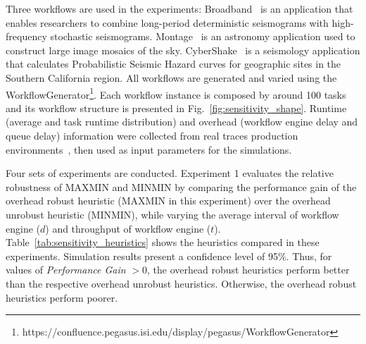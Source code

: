 Three workflows are used in the experiments: 
Broadband~\cite{Broadband} is an application that enables researchers to combine long-period deterministic seismograms with high-frequency stochastic seismograms. 
Montage~\cite{Sakellariou2010} is an astronomy application used to construct large image mosaics of the sky. CyberShake~\cite{Callaghan2008} is a seismology application that calculates Probabilistic Seismic Hazard curves for geographic sites in the Southern California region. All workflows are generated and varied using the WorkflowGenerator\footnote[1]{https://confluence.pegasus.isi.edu/display/pegasus/WorkflowGenerator}. Each workflow instance is composed by around 100 tasks and its workflow structure is presented in Fig.~\ref{fig:sensitivity_shape}. Runtime (average and task runtime distribution) and overhead (workflow engine delay and queue delay) information were collected from real traces production environments~\cite{Chen2011, Juve2013}, then used as input parameters for the simulations.




Four sets of experiments are conducted. Experiment 1 evaluates the relative robustness of MAXMIN and MINMIN by comparing the performance gain of the overhead robust heuristic (MAXMIN in this experiment) over the overhead unrobust heuristic (MINMIN), while varying the average interval of workflow engine ($d$) and throughput of workflow engine ($t$). Table~\ref{tab:sensitivity_heuristics} shows the heuristics compared in these experiments. Simulation results present a confidence level of 95\%. Thus, for values of \emph{Performance Gain} $> 0$, the overhead robust heuristics perform better than the respective overhead unrobust heuristics. Otherwise, the overhead robust heuristics perform poorer.




